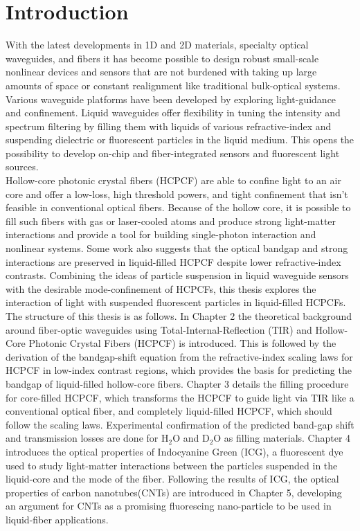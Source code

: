 \chapter{Introduction}
With the latest developments in 1D and 2D materials, specialty optical waveguides, and fibers it has become possible to design robust small-scale nonlinear devices and sensors\cite{cusano,yamashita.tutorial} that are not burdened with taking up large amounts of space or constant realignment like traditional bulk-optical systems.
Various waveguide platforms have been developed by exploring light-guidance and confinement.
Liquid waveguides offer flexibility in tuning the intensity and spectrum filtering by filling them with liquids of various refractive-index and suspending dielectric or fluorescent particles in the liquid medium\cite{conroy, bliss, vezenov}.
This opens the possibility to develop on-chip and fiber-integrated sensors and fluorescent light sources.\\
Hollow-core photonic crystal fibers (HCPCF) are able to confine light to an air core and offer a low-loss, high threshold powers, and tight confinement that isn't feasible in conventional optical fibers.
Because of the hollow core, it is possible to fill such fibers with gas or laser-cooled atoms and produce strong light-matter interactions\cite{bajcsy, hilton} and provide a tool for building single-photon interaction and nonlinear systems.
Some work also suggests that the optical bandgap and strong interactions are preserved in liquid-filled HCPCF \cite{antonopoulos} despite lower refractive-index contrasts.
Combining the ideas of particle suspension in liquid waveguide sensors with the desirable mode-confinement of HCPCFs, this thesis explores the interaction of light with suspended fluorescent particles in liquid-filled HCPCFs.\\ 

The structure of this thesis is as follows. In Chapter 2 the theoretical background around fiber-optic waveguides using Total-Internal-Reflection (TIR) and Hollow-Core Photonic Crystal Fibers (HCPCF) is introduced. This is followed by the derivation of the bandgap-shift equation from the refractive-index scaling laws for HCPCF in low-index contrast regions, which provides the basis for predicting the bandgap of liquid-filled hollow-core fibers.
Chapter 3 details the filling procedure for core-filled HCPCF, which transforms the HCPCF to guide light via TIR like a conventional optical fiber, and completely liquid-filled HCPCF, which should follow the scaling laws. Experimental confirmation of the predicted band-gap shift and transmission losses are done for H${}_2$O and D${}_2$O as filling materials. Chapter 4 introduces the optical properties of Indocyanine Green (ICG), a fluorescent dye used to study light-matter interactions between the particles suspended in the liquid-core and the mode of the fiber. Following the results of ICG, the optical properties of carbon nanotubes(CNTs) are introduced in Chapter 5, developing an argument for CNTs as a promising fluorescing nano-particle to be used in liquid-fiber applications. 
